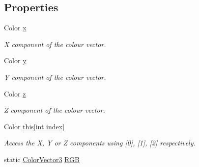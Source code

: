 \subsection*{Properties}
\begin{DoxyCompactItemize}
\item 
Color \hyperlink{class_grid_framework_1_1_vectors_1_1_color_vector3_a5ea343a66fb2f8f1dc3294761f9a9506_a5ea343a66fb2f8f1dc3294761f9a9506}{x}
\begin{DoxyCompactList}\small\item\em X component of the colour vector.\end{DoxyCompactList}\item 
Color \hyperlink{class_grid_framework_1_1_vectors_1_1_color_vector3_a10438170f7d6aa99e0a0bef67edd1339_a10438170f7d6aa99e0a0bef67edd1339}{y}
\begin{DoxyCompactList}\small\item\em Y component of the colour vector.\end{DoxyCompactList}\item 
Color \hyperlink{class_grid_framework_1_1_vectors_1_1_color_vector3_ad2a62e1eb83e3ef54e03c99018b0926a_ad2a62e1eb83e3ef54e03c99018b0926a}{z}
\begin{DoxyCompactList}\small\item\em Z component of the colour vector.\end{DoxyCompactList}\item 
Color \hyperlink{class_grid_framework_1_1_vectors_1_1_color_vector3_ac99c9fff55da6ac286b439efdaab70d4_ac99c9fff55da6ac286b439efdaab70d4}{this\mbox{[}int index\mbox{]}}
\begin{DoxyCompactList}\small\item\em Access the X, Y or Z components using \mbox{[}0\mbox{]}, \mbox{[}1\mbox{]}, \mbox{[}2\mbox{]} respectively.\end{DoxyCompactList}\item 
static \hyperlink{class_grid_framework_1_1_vectors_1_1_color_vector3}{Color\+Vector3} \hyperlink{class_grid_framework_1_1_vectors_1_1_color_vector3_aeeafb94ea145ed8d92494a60932b41ff_aeeafb94ea145ed8d92494a60932b41ff}{R\+G\+B}

\end{DoxyCompactItemize}
